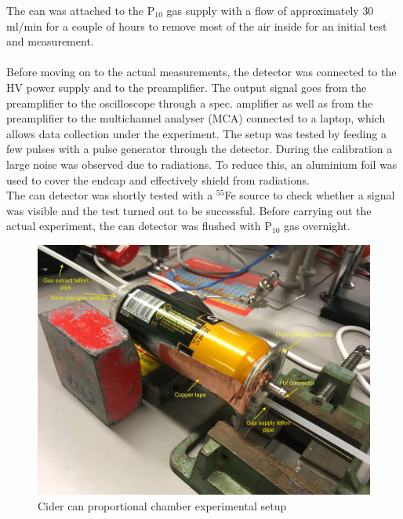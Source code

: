 The can was attached to the P$_{10}$ gas supply with a flow of approximately $30$ ml/min for a couple of hours to remove most of the air inside for an initial test and measurement. \\ \\
Before moving on to the actual measurements, the detector was connected to the HV power supply and to the preamplifier. The output signal goes from the preamplifier to the oscilloscope through a spec. amplifier as well as from the preamplifier to the multichannel analyser (MCA) connected to a laptop, which allows data collection under the experiment. The setup was tested by feeding a few pulses with a pulse generator through the detector. During the calibration a large noise was observed due to radiations. To reduce this, an aluminium foil was used to cover the endcap and effectively shield from radiations. \\
The can detector was shortly tested with a $^{55}$Fe source to check whether a signal was visible and the test turned out to be successful. Before carrying out the actual experiment, the can detector was flushed with P$_{10}$ gas overnight.

\begin{figure}[h!]
	\centering
	\includegraphics[width=\textwidth]{./sections/graphics/BeerCanSetup.JPG}
	\caption{Cider can proportional chamber experimental setup}
	\label{fig:BeerCan}
\end{figure}

